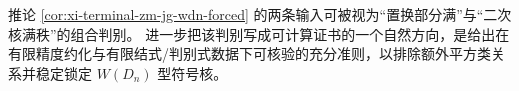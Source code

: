 \begin{remark}[可计算判别接口的自然目标]\label{rem:xi-terminal-zm-jg-effective-squareclass-test}
推论 \ref{cor:xi-terminal-zm-jg-wdn-forced} 的两条输入可被视为“置换部分满”与“二次核满秩”的组合判别。
进一步把该判别写成可计算证书的一个自然方向，是给出在有限精度约化与有限结式/判别式数据下可核验的充分准则，以排除额外平方类关系并稳定锁定 \(W(D_n)\) 型符号核。
\end{remark}


